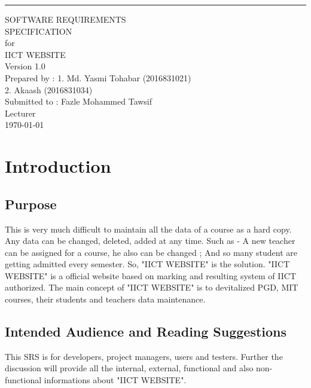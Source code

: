 \documentclass{scrreprt}
\date{}
\def\myversion{1.0 }
\begin{document}
	
	\begin{flushright}
		\rule{16cm}{5pt}\vskip1cm
		\begin{bfseries}
			\Huge{SOFTWARE REQUIREMENTS\\ SPECIFICATION}\\
			\vspace{1.5cm}
			for\\
			\vspace{1.5cm}
			IICT WEBSITE\\
			\vspace{1.5cm}
			\LARGE{Version \myversion}\\
			\vspace{1.5cm}
			Prepared by : 1. Md. Yasmi Tohabar (2016831021)\\
			2. Akaash (2016831034)\\
			\vspace{1.5cm}
			Submitted to : Fazle Mohammed Tawsif \\Lecturer\\
			\vspace{1.5cm}
			\today\\
		\end{bfseries}
	\end{flushright}
	
	\tableofcontents
	
	\chapter{Introduction}
	
	\section{Purpose}
	This is very much difficult to maintain all the data of a course as a hard copy. Any data can be changed, deleted, added at any time. Such as - A new teacher can be assigned for a course, he also can be changed ; And so many student are getting admitted every semester. So, "IICT WEBSITE" is the solution. "IICT WEBSITE" is a official website based on marking and resulting system of IICT authorized. The main concept of "IICT WEBSITE" is to devitalized PGD, MIT courses, their students and teachers data maintenance. 
	
	\section{Intended Audience and Reading Suggestions}
	This SRS is for developers, project managers, users and testers. Further the discussion will provide all the internal, external, functional and also non-functional informations about "IICT WEBSITE".
	
\end{document}
